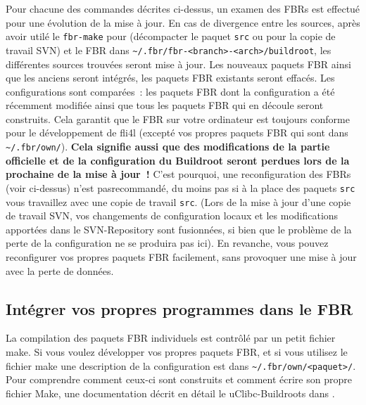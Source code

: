 Pour chacune des commandes décrites ci-dessus, un examen des FBRs est effectué
pour une évolution de la mise à jour. En cas de divergence entre les sources,
après avoir utilé le \texttt{fbr-make} pour (décompacter le paquet \texttt{src}
ou pour la copie de travail SVN) et le FBR dans \texttt{\~{}/.fbr/fbr-<branch>-<arch>/buildroot},
les différentes sources trouvées seront mise à jour. Les nouveaux paquets FBR
ainsi que les anciens seront intégrés, les paquets FBR existants seront effacés.
Les configurations sont comparées~: les paquets FBR dont la configuration a été
récemment modifiée ainsi que tous les paquets FBR qui en découle seront construits.
Cela garantit que le FBR sur votre ordinateur est toujours conforme pour le
développement de fli4l (excepté vos propres paquets FBR qui sont dans \texttt{\~{}/.fbr/own/}).
\textbf{Cela signifie aussi que des modifications de la partie officielle et de
la configuration du Buildroot seront perdues lors de la prochaine de la mise à jour~!}
C'est pourquoi, une reconfiguration des FBRs (voir ci-dessus) n'est pasrecommandé,
du moins pas si à la place des paquets \texttt{src} vous travaillez avec une copie
de travail \texttt{src}. (Lors de la mise à jour d'une copie de travail SVN,
vos changements de configuration locaux et les modifications apportées dans le
SVN-Repository sont fusionnées, si bien que le problème de la perte de la
configuration ne se produira pas ici). En revanche, vous pouvez reconfigurer
vos propres paquets FBR facilement, sans provoquer une mise à jour avec la perte
de données.

\subsection{Intégrer vos propres programmes dans le FBR}

La compilation des paquets FBR individuels est contrôlé par un petit fichier
make. Si vous voulez développer vos propres paquets FBR, et si vous utilisez
le fichier make une description de la configuration est dans \texttt{\~{}/.fbr/own/<paquet>/}.
Pour comprendre comment ceux-ci sont construits et comment écrire son propre fichier
Make, une documentation décrit en détail le uClibc-Buildroots dans
.
